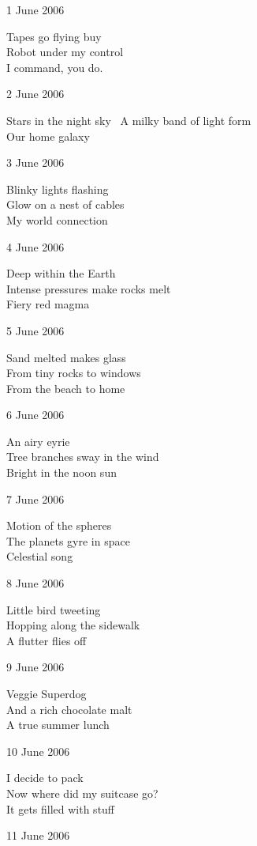 \documentclass[12pt]{article}
\begin{document}
\setlength{\parskip}{1mm}
\newpage

1 June 2006

Tapes go flying buy \\
Robot under my control \\
I command, you do.

2 June 2006

Stars in the night sky \
A milky band of light form \\
Our home galaxy

3 June 2006

Blinky lights flashing \\
Glow on a nest of cables \\
My world connection

4 June 2006

Deep within the Earth \\
Intense pressures make rocks melt \\
Fiery red magma

5 June 2006

Sand melted makes glass \\
From tiny rocks to windows \\
From the beach to home

6 June 2006

An airy eyrie \\
Tree branches sway in the wind \\
Bright in the noon sun

\newpage

7 June 2006

Motion of the spheres \\
The planets gyre in space \\
Celestial song

8 June 2006

Little bird tweeting \\
Hopping along the sidewalk \\
A flutter flies off

9 June 2006

Veggie Superdog \\
And a rich chocolate malt \\
A true summer lunch 

10 June 2006

I decide to pack \\
Now where did my suitcase go? \\
It gets filled with stuff

11 June 2006
\end{document}
